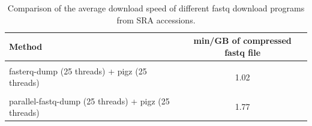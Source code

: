 \documentclass[
  openany]{book}
\begin{document}
\begin{table}[!h]

\begin{threeparttable}
\caption{\label{tab:fqd-speed}Comparison of the average download speed of different fastq download programs from SRA accessions.}
\centering
\begin{tabular}[t]{lc}
\toprule
Method & min/GB of compressed fastq file\\
\midrule
\cellcolor{gray!6}{fastq-dump} & \cellcolor{gray!6}{8.97}\\
fasterq-dump (25 threads) + pigz (25 threads) & 1.02\\
\cellcolor{gray!6}{parallel-fastq-dump (--gzip; 25 threads)} & \cellcolor{gray!6}{1.5}\\
parallel-fastq-dump (25 threads) + pigz (25 threads) & 1.77\\
\bottomrule
\end{tabular}
\begin{tablenotes}
\small
\item [] 
\end{tablenotes}
\end{threeparttable}
\end{table}
\end{document}
